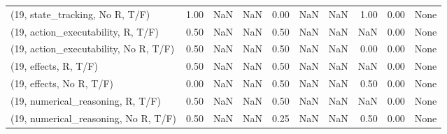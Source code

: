 \begin{table*}[h!]
\begin{adjustbox}{width=2\columnwidth,center}
\begin{tabular}{lrrr|rrr|rrr}
(19, state\_tracking, No R, T/F)       &                      1.00 &                   NaN &                       NaN &                          0.00 &                       NaN &                           NaN &                                   1.00 &                               0.00 &                                  None \\
(19, action\_executability, R, T/F)    &                      0.50 &                   NaN &                       NaN &                          0.50 &                       NaN &                           NaN &                                    NaN &                               0.00 &                                  None \\
(19, action\_executability, No R, T/F) &                      0.50 &                   NaN &                       NaN &                          0.50 &                       NaN &                           NaN &                                   0.00 &                               0.00 &                                  None \\
(19, effects, R, T/F)                 &                      0.50 &                   NaN &                       NaN &                          0.50 &                       NaN &                           NaN &                                    NaN &                               0.00 &                                  None \\
(19, effects, No R, T/F)              &                      0.00 &                   NaN &                       NaN &                          0.50 &                       NaN &                           NaN &                                   0.50 &                               0.00 &                                  None \\
(19, numerical\_reasoning, R, T/F)     &                      0.50 &                   NaN &                       NaN &                          0.50 &                       NaN &                           NaN &                                    NaN &                               0.00 &                                  None \\
(19, numerical\_reasoning, No R, T/F)  &                      0.50 &                   NaN &                       NaN &                          0.25 &                       NaN &                           NaN &                                   0.50 &                               0.00 &                                  None \\

\end{tabular}
\end{adjustbox}
\end{table*}
